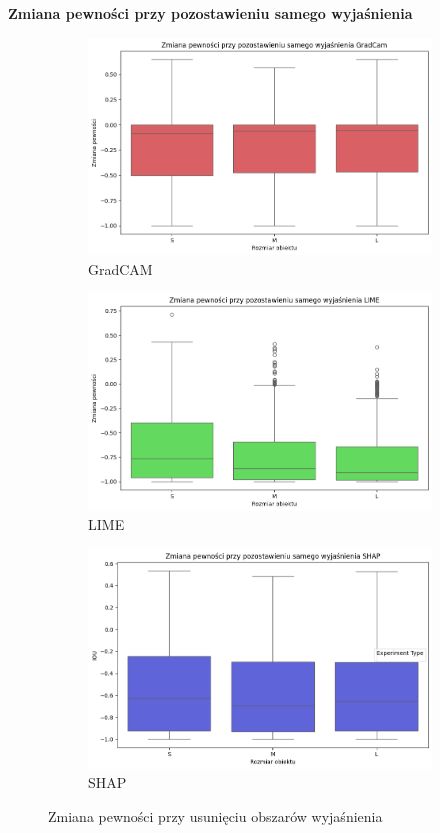 \textbf{Zmiana pewności przy pozostawieniu samego wyjaśnienia}
\begin{figure}
	\centering
	\begin{subfigure}[b]{0.3\textwidth}
		\centering\includegraphics[width=.9\textwidth]{img/size_confidence_exp_gradcam}
		\caption{GradCAM}  \label{rys:size_confidence_mask_gradcam}
	\end{subfigure}
	\begin{subfigure}[b]{0.3\textwidth}
		\centering\includegraphics[width=.9\textwidth]{img/size_confidence_exp_lime}
		\caption{LIME}  \label{rys:size_confidence_mask_lime}
	\end{subfigure}
	\begin{subfigure}[b]{0.3\textwidth}
		\centering\includegraphics[width=.9\textwidth]{img/size_confidence_exp_shap}
		\caption{SHAP}  \label{rys:size_confidence_mask_shap}
	\end{subfigure}
	\caption{Zmiana pewności przy usunięciu obszarów wyjaśnienia}
\end{figure}

